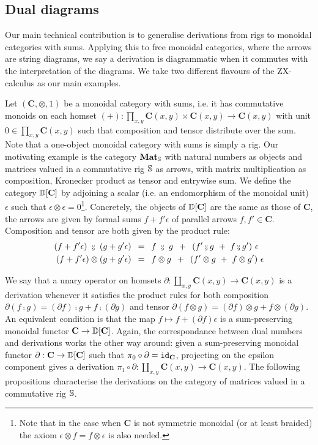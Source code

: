 
\subsection{Dual diagrams}\label{2-dual-diagrams}

Our main technical contribution is to generalise derivations from rigs to
monoidal categories with sums. Applying this to free monoidal categories,
where the arrows are string diagrams, we say a derivation is diagrammatic
when it commutes with the interpretation of the diagrams. We take two
different flavours of the ZX-calculus as our main examples.

Let $(\mathbf{C}, \otimes, 1)$ be a monoidal category with sums, i.e.
it has commutative monoids on each homset $(+) : \prod_{x,y}
\mathbf{C}(x, y) \times \mathbf{C}(x, y) \to \mathbf{C}(x, y)$
with unit $0 \in \prod_{x,y} \mathbf{C}(x, y)$
such that composition and tensor distribute over the sum.
Note that a one-object monoidal category with sums is simply a rig.
Our motivating example is the category $\mathbf{Mat}_\S$ with natural numbers
as objects and matrices valued in a commutative rig $\S$ as arrows, with matrix
multiplication as composition, Kronecker product as tensor and entrywise sum.
We define the category $\D[\mathbf{C}]$ by adjoining a scalar (i.e. an
endomorphism of the monoidal unit) $\epsilon$ such that $\epsilon \otimes \epsilon = 0$\footnote{
Note that in the case when $\mathbf{C}$ is not symmetric monoidal (or at least braided) the axiom $\epsilon \otimes f = f \otimes \epsilon$ is also needed.
}.
Concretely, the objects of $\D[\mathbf{C}]$ are the same as those of $\mathbf{C}$, the arrows
are given by formal sums $f + f' \epsilon$ of parallel arrows $f, f' \in \mathbf{C}$.
Composition and tensor are both given by the product rule:
\begin{align}
    (f + f' \epsilon) \ \fcmp \ (g + g' \epsilon)
    &\s = \s f \ \fcmp \ g \s + \s (f' \fcmp g \ + \ f \fcmp g') \ \epsilon\\
    (f + f' \epsilon) \otimes (g + g' \epsilon)
    &\s = \s f \otimes g \s + \s (f' \otimes g \ + \ f \otimes g') \ \epsilon
\end{align}

We say that a unary operator on homsets $\partial : \coprod_{x,y}
\mathbf{C}(x, y) \to \mathbf{C}(x, y)$ is a derivation whenever it satisfies the product rules for both composition
$\partial (f \fcmp g) = (\partial f) \fcmp g + f \fcmp (\partial g)$
and tensor
$\partial (f \otimes g) = (\partial f) \otimes g + f \otimes (\partial g)$.
An equivalent condition is that the map $f \mapsto f + (\partial f) \epsilon$
is a sum-preserving monoidal functor $\mathbf{C} \to \D[\mathbf{C}]$.
Again, the correspondance between dual numbers and derivations works the other
way around: given a sum-preserving monoidal functor
$\partial : \mathbf{C} \to \D[\mathbf{C}]$ such that
$\pi_0 \circ \partial = \id_{\mathbf{C}}$, projecting on the epsilon component
gives a derivation $\pi_1 \circ \partial : \coprod_{x,y}
\mathbf{C}(x, y) \to \mathbf{C}(x, y)$. The following propositions characterise
the derivations on the category of matrices valued in a commutative rig $\S$.

